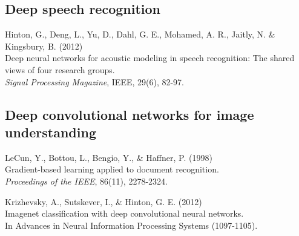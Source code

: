 \documentclass[]{article}
\begin{document}

\subsection{Deep speech recognition}


Hinton, G., Deng, L., Yu, D., Dahl, G. E., Mohamed, A. R., Jaitly, N. \&
Kingsbury, B. (2012)\\ Deep neural networks for acoustic modeling in speech
recognition: The shared views of four research groups.\\ {\it Signal
  Processing Magazine}, IEEE, 29(6), 82-97.


\subsection{Deep convolutional networks for image understanding}
LeCun, Y., Bottou, L., Bengio, Y., \& Haffner, P. (1998)\\ Gradient-based
learning applied to document recognition.\\ {\it Proceedings of the IEEE},
86(11), 2278-2324.


Krizhevsky, A., Sutskever, I., \& Hinton, G. E. (2012)\\ Imagenet
classification with deep convolutional neural networks.\\ In Advances in
Neural Information Processing Systems (1097-1105).

\end{document}
